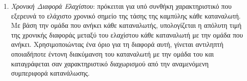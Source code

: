 \begin{enumerate}
\begin{center}
\end{center}
\item{\textit{Χρονική Διαφορά Ελαχίστου}}: πρόκειται για υπό συνθήκη χαρακτηριστικό που εξερευνά το ελάχιστο χρονικό σημείο της τάσης της καμπύλης κάθε καταναλωτή. Με βάση την ομάδα που ανήκει κάθε καταναλωτής, υπολογίζεται η απόλυτη τιμή της χρονικής διαφοράς μεταξύ του ελαχίστου κάθε καταναλωτή με την ομάδα που ανήκει. Χρησιμοποιώντας ένα όριο για τη διαφορά αυτή, γίνεται αντιληπτή οποιαδήποτε έντονη διακύμανση του καταναλωτή με την ομάδα του και καταγράφεται σαν χαρακτηριστικό διαχωρισμού από την αναμενόμενη συμπεριφορά κατανάλωσης.
\begin{center}
\end{center}
\end{enumerate}

